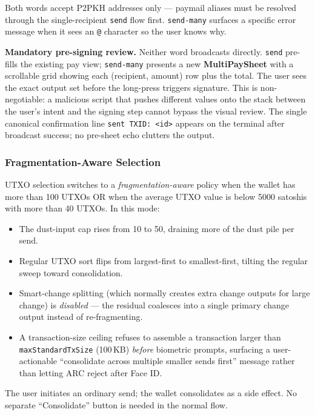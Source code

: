 \documentclass[a4paper, 11pt, openany]{book}
\begin{document}
Both words accept P2PKH addresses only --- paymail aliases must be resolved through the single-recipient \texttt{send} flow first. \texttt{send-many} surfaces a specific error message when it sees an \texttt{@} character so the user knows why.

\begin{notebox}
\textbf{Mandatory pre-signing review.} Neither word broadcasts directly. \texttt{send} pre-fills the existing pay view; \texttt{send-many} presents a new \textbf{MultiPaySheet} with a scrollable grid showing each (recipient, amount) row plus the total. The user sees the exact output set before the long-press triggers signature. This is non-negotiable: a malicious script that pushes different values onto the stack between the user's intent and the signing step cannot bypass the visual review. The single canonical confirmation line \texttt{sent TXID: <id>} appears on the terminal after broadcast success; no pre-sheet echo clutters the output.
\end{notebox}

\subsubsection*{Fragmentation-Aware Selection}

UTXO selection switches to a \emph{fragmentation-aware} policy when the wallet has more than 100 UTXOs OR when the average UTXO value is below 5000 satoshis with more than 40 UTXOs. In this mode:

\begin{itemize}
\item The dust-input cap rises from 10 to 50, draining more of the dust pile per send.
\item Regular UTXO sort flips from largest-first to smallest-first, tilting the regular sweep toward consolidation.
\item Smart-change splitting (which normally creates extra change outputs for large change) is \emph{disabled} --- the residual coalesces into a single primary change output instead of re-fragmenting.
\item A transaction-size ceiling refuses to assemble a transaction larger than \texttt{maxStandardTxSize} (100\,KB) \emph{before} biometric prompts, surfacing a user-actionable ``consolidate across multiple smaller sends first'' message rather than letting ARC reject after Face ID.
\end{itemize}

The user initiates an ordinary send; the wallet consolidates as a side effect. No separate ``Consolidate'' button is needed in the normal flow.
\end{document}
